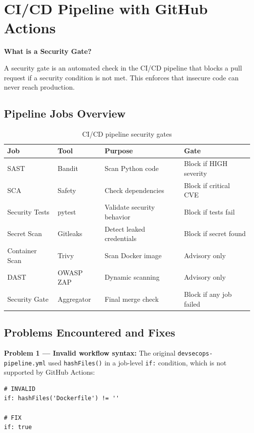 \documentclass[12pt,a4paper]{report}
\begin{document}
\section{CI/CD Pipeline with GitHub Actions}

\textbf{What is a Security Gate?}

A security gate is an automated check in the CI/CD pipeline that blocks a pull request if a security condition is not met. This enforces that insecure code can never reach production.

\subsection{Pipeline Jobs Overview}

\begin{table}[H]
\centering
\begin{tabularx}{\textwidth}{l l X l}
\toprule
\textbf{Job} & \textbf{Tool} & \textbf{Purpose} & \textbf{Gate} \\
\midrule
SAST & Bandit & Scan Python code & Block if HIGH severity \\
SCA & Safety & Check dependencies & Block if critical CVE \\
Security Tests & pytest & Validate security behavior & Block if tests fail \\
Secret Scan & Gitleaks & Detect leaked credentials & Block if secret found \\
Container Scan & Trivy & Scan Docker image & Advisory only \\
DAST & OWASP ZAP & Dynamic scanning & Advisory only \\
Security Gate & Aggregator & Final merge check & Block if any job failed \\
\bottomrule
\end{tabularx}
\caption{CI/CD pipeline security gates}
\end{table}

\subsection{Problems Encountered and Fixes}

\begin{warningbox}
\textbf{Problem 1 — Invalid workflow syntax:}
The original \texttt{devsecops-pipeline.yml} used \texttt{hashFiles()} in a job-level \texttt{if:} condition, which is not supported by GitHub Actions:
\begin{lstlisting}[style=bashstyle]
# INVALID
if: hashFiles('Dockerfile') != ''

# FIX
if: true
\end{lstlisting}
\end{warningbox}
\end{document}
